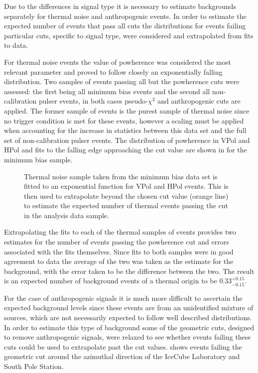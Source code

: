 Due to the differences in signal type it is necessary to estimate backgrounds separately for thermal noise and anthropogenic events. In order to estimate the expected number of events that pass all cuts the distributions for events failing particular cuts, specific to signal type, were considered and extrapolated from fits to data.

For thermal noise events the value of powherence was considered the most relevant parameter and proved to follow closely an exponentially falling distribution. Two samples of events passing all but the powherence cuts were assessed: the first being all minimum bias events and the second all non-calibration pulser events, in both cases pseudo-$\chi^{2}$ and anthropogenic cuts are applied. The former sample of events is the purest sample of thermal noise since no trigger condition is met for these events, however a scaling must be applied when accounting for the increase in statistics between this data set and the full set of non-calibration pulser events. The distribution of powherence in VPol and HPol and fits to the falling edge approaching the cut value are shown in  for the minimum bias sample. 

\begin{figure}[htpb]
\hfill
{}
\caption{Thermal noise sample taken from the minimum bias data set is fitted to an exponential function for VPol and HPol events. This is then used to extrapolate beyond the chosen cut value (orange line) to estimate the expected number of thermal events passing the cut in the analysis data sample.}
\label{fig:Analysis:Background-Estimation:Thermal-Background}
\end{figure}

Extrapolating the fits to each of the thermal samples of events provides two estimates for the number of events passing the powherence cut and errors associated with the fits themselves. Since fits to both samples were in good agreement to data the average of the two was taken as the estimate for the background, with the error taken to be the difference between the two. The result is an expected number of background events of a thermal origin to be $0.33^{+0.15}_{-0.15}$.

For the case of anthropogenic signals it is much more difficult to ascertain the expected background levels since these events are from an unidentified mixture of sources, which are not necessarily expected to follow well described distributions. In order to estimate this type of background some of the geometric cuts, designed to remove anthropogenic signals, were relaxed to see whether events failing these cuts could be used to extrapolate past the cut values.  shows events failing the geometric cut around the azimuthal direction of the IceCube Laboratory and South Pole Station.

